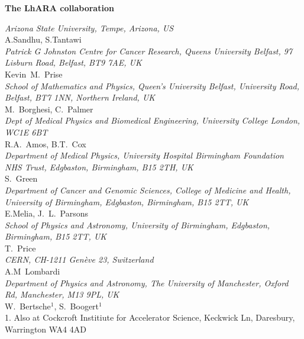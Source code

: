 \vspace{0.75cm}
\begin{center}
  {\bf \color{BlueViolet} The LhARA collaboration} \\
  \vspace{0.25cm}
\end{center}
\noindent \textit{Arizona State University, Tempe, Arizona, US} \\
A.Sandhu, S.Tantawi \\
 
\noindent \textit{Patrick G Johnston Centre for Cancer Research, Queens University Belfast, 97 Lisburn Road, Belfast, BT9 7AE, UK} \\
Kevin~M.~Prise \\
 
\noindent \textit{School of Mathematics and Physics, Queen's University Belfast, University Road, Belfast, BT7 1NN, Northern Ireland, UK} \\
M.~Borghesi, C.~Palmer \\
 
\noindent \textit{Dept of Medical Physics and Biomedical Engineering, University College London, WC1E 6BT} \\
R.A.~Amos, B.T.~Cox \\
 
\noindent \textit{Department of Medical Physics, University Hospital Birmingham Foundation NHS Trust, Edgbaston, Birmingham, B15 2TH, UK} \\
S.~Green \\
 
\noindent \textit{Department of Cancer and Genomic Sciences, College of Medicine and Health, University of Birmingham, Edgbaston, Birmingham, B15 2TT, UK} \\
E.Melia, J.~L.~Parsons \\
 
\noindent \textit{School of Physics and Astronomy, University of Birmingham, Edgbaston, Birmingham, B15 2TT, UK} \\
T.~Price \\
 
\noindent \textit{CERN, CH-1211 Gen\`eve 23, Switzerland} \\
A.M~Lombardi \\
 
\noindent \textit{Department of Physics and Astronomy, The University of Manchester, Oxford Rd, Manchester, M13 9PL, UK} \\
W.~Bertsche$^{1}$, S.~Boogert$^{1}$ \\
{\footnotesize
  1. Also at Cockcroft Institiute for Accelerator Science, Keckwick Ln, Daresbury, Warrington WA4 4AD \\
}
 
